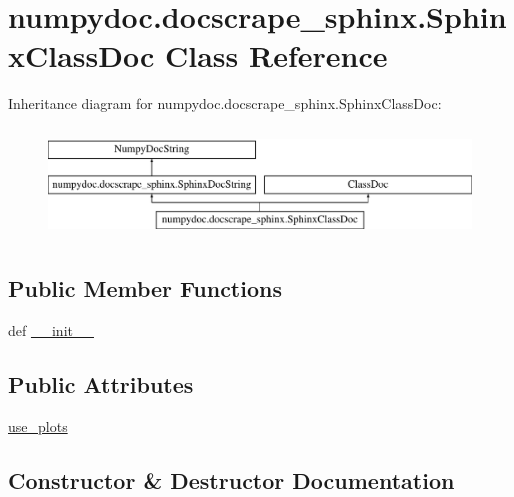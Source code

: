 \hypertarget{classnumpydoc_1_1docscrape__sphinx_1_1SphinxClassDoc}{}\section{numpydoc.\+docscrape\+\_\+sphinx.\+Sphinx\+Class\+Doc Class Reference}
\label{classnumpydoc_1_1docscrape__sphinx_1_1SphinxClassDoc}
Inheritance diagram for numpydoc.\+docscrape\+\_\+sphinx.\+Sphinx\+Class\+Doc\+:\begin{figure}[H]
\begin{center}
\leavevmode
\includegraphics[height=2.968198cm]{classnumpydoc_1_1docscrape__sphinx_1_1SphinxClassDoc}
\end{center}
\end{figure}
\subsection*{Public Member Functions}
\begin{DoxyCompactItemize}
\item 
def \hyperlink{classnumpydoc_1_1docscrape__sphinx_1_1SphinxClassDoc_ae09ac5d183309185d29f0e173fc365a1}{\+\_\+\+\_\+init\+\_\+\+\_\+}
\end{DoxyCompactItemize}
\subsection*{Public Attributes}
\begin{DoxyCompactItemize}
\item 
\hyperlink{classnumpydoc_1_1docscrape__sphinx_1_1SphinxClassDoc_a4bb3aba84c69f88fb83019cc33dc3ab8}{use\+\_\+plots}
\end{DoxyCompactItemize}


\subsection{Constructor \& Destructor Documentation}
\hypertarget{classnumpydoc_1_1docscrape__sphinx_1_1SphinxClassDoc_ae09ac5d183309185d29f0e173fc365a1}{}

